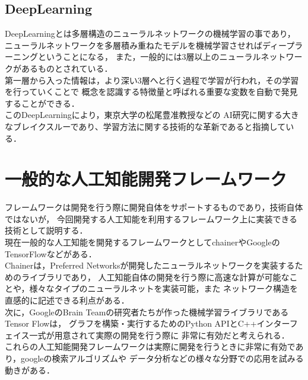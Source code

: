 \subsection{DeepLearning}
DeepLearning\cite{deep}とは多層構造のニューラルネットワークの機械学習の事であり，
ニューラルネットワークを多層積み重ねたモデルを機械学習させればディープラーニングということになる，
また，一般的には3層以上のニューラルネットワークがあるものとされている．
\\

第一層から入った情報は，より深い3層へと行く過程で学習が行われ，その学習を行っていくことで
概念を認識する特徴量と呼ばれる重要な変数を自動で発見することができる．
\\

このDeepLearningにより，東京大学の松尾豊准教授\cite{boom}などの
AI研究に関する大きなブレイクスルーであり、学習方法に関する技術的な革新であると指摘している．
\\

\section{一般的な人工知能開発フレームワーク}
フレームワークは開発を行う際に開発自体をサポートするものであり，技術自体ではないが，
今回開発する人工知能を利用するフレームワーク上に実装できる技術として説明する．\\

現在一般的な人工知能を開発するフレームワークとしてchainerやGoogleのTensorFlowなどがある．
\\
Chainerは，Preferred Networksが開発したニューラルネットワークを実装するためのライブラリであり，
人工知能自体の開発を行う際に高速な計算が可能なことや，様々なタイプのニューラルネットを実装可能，また
ネットワーク構造を直感的に記述できる利点がある．
\\
次に，GoogleのBrain Teamの研究者たちが作った機械学習ライブラリであるTensor Flowは，
グラフを構築・実行するためのPython APIとC++インターフェイス一式が用意されて実際の開発を行う際に
非常に有効だと考えられる．
\\

これらの人工知能開発フレームワークは実際に開発を行うときに非常に有効であり，googleの検索アルゴリズムや
データ分析などの様々な分野での応用を試みる動きがある．
\\
